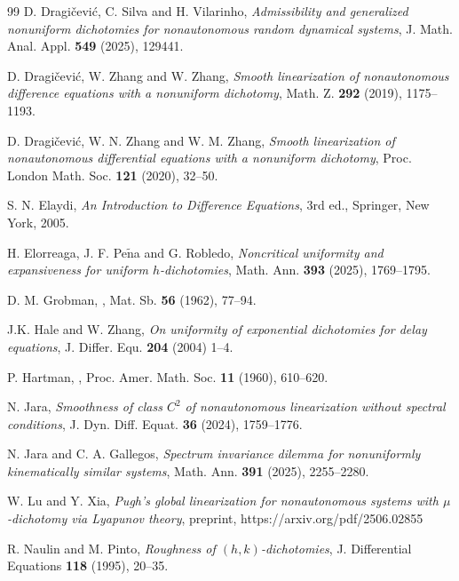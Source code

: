 \documentclass[reqno, a4paper, 10pt]{amsart}
\theoremstyle{plain}
\numberwithin{equation}{section}
\theoremstyle{remark}
\begin{document}
\begin{thebibliography}{99}
D. Dragi\v cevi\' c, C. Silva and H. Vilarinho, \emph{Admissibility and generalized nonuniform dichotomies for nonautonomous random dynamical systems}, J. Math. Anal. Appl. \textbf{549} (2025), 129441.


 D. Dragi\v cevi\' c, W. Zhang and W. Zhang, \emph{Smooth linearization of nonautonomous difference equations with a nonuniform dichotomy}, Math. Z. \textbf{292} (2019), 1175--1193.


 D. Dragi\v{c}evi\'c, W. N. Zhang and W. M. Zhang, \emph{Smooth linearization of nonautonomous differential equations
with a nonuniform dichotomy}, Proc. London Math. Soc. {\bf 121} (2020), 32--50.

 S. N. Elaydi, {\it An Introduction to Difference Equations}, 3rd ed., Springer, New York, 2005.

H. Elorreaga, J. F. Pe$\tilde{\text{n}}$a and G. Robledo, \emph{Noncritical uniformity and expansiveness for uniform $h$-dichotomies}, Math. Ann. \textbf{393} (2025), 1769--1795.

 D. M. Grobman,
 ,
 \newblock Mat. Sb. {\bf 56} (1962), 77--94.

  J.K. Hale and W. Zhang, \emph{On uniformity of exponential dichotomies for delay equations}, J. Differ. Equ. \textbf{204} (2004) 1--4.

 P. Hartman,
 ,
  \newblock    Proc. Amer. Math. Soc. {\bf 11} (1960), 610--620.
  
 N. Jara, \emph{Smoothness of class $C^2$ of nonautonomous linearization without spectral conditions},  J. Dyn. Diff. Equat. \textbf{36} (2024), 1759--1776.

N. Jara and C. A. Gallegos,
\emph{Spectrum invariance dilemma for nonuniformly kinematically similar systems}, 
Math. Ann. \textbf{391} (2025), 2255--2280.

W. Lu and Y. Xia, \emph{Pugh's global linearization for nonautonomous systems with $\mu$-dichotomy via Lyapunov theory}, preprint, https://arxiv.org/pdf/2506.02855

R. Naulin and M. Pinto, \emph{Roughness of $(h,k)$-dichotomies}, J. Differential Equations \textbf{118} (1995), 20--35.


\end{thebibliography}
\end{document}
